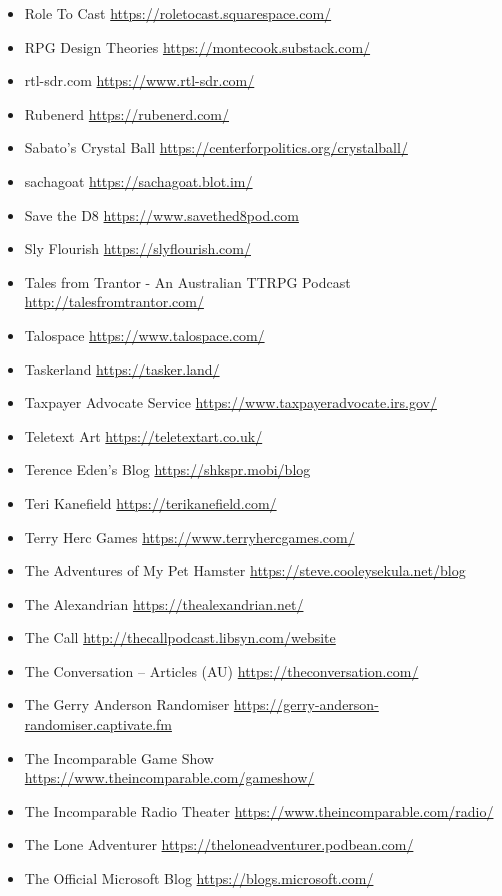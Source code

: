 \begin{itemize}
\item
  Role To Cast \url{https://roletocast.squarespace.com/}
\item
  RPG Design Theories \url{https://montecook.substack.com/}
\item
  rtl-sdr.com \url{https://www.rtl-sdr.com/}
\item
  Rubenerd \url{https://rubenerd.com/}
\item
  Sabato's Crystal Ball \url{https://centerforpolitics.org/crystalball/}
\item
  sachagoat \url{https://sachagoat.blot.im/}
\item
  Save the D8 \url{https://www.savethed8pod.com}
\item
  Sly Flourish \url{https://slyflourish.com/}
\item
  Tales from Trantor - An Australian TTRPG Podcast
  \url{http://talesfromtrantor.com/}
\item
  Talospace \url{https://www.talospace.com/}
\item
  Taskerland \url{https://tasker.land/}
\item
  Taxpayer Advocate Service \url{https://www.taxpayeradvocate.irs.gov/}
\item
  Teletext Art \url{https://teletextart.co.uk/}
\item
  Terence Eden's Blog \url{https://shkspr.mobi/blog}
\item
  Teri Kanefield \url{https://terikanefield.com/}
\item
  Terry Herc Games \url{https://www.terryhercgames.com/}
\item
  The Adventures of My Pet Hamster
  \url{https://steve.cooleysekula.net/blog}
\item
  The Alexandrian \url{https://thealexandrian.net/}
\item
  The Call \url{http://thecallpodcast.libsyn.com/website}
\item
  The Conversation -- Articles (AU) \url{https://theconversation.com/}
\item
  The Gerry Anderson Randomiser
  \url{https://gerry-anderson-randomiser.captivate.fm}
\item
  The Incomparable Game Show
  \url{https://www.theincomparable.com/gameshow/}
\item
  The Incomparable Radio Theater
  \url{https://www.theincomparable.com/radio/}
\item
  The Lone Adventurer \url{https://theloneadventurer.podbean.com/}
\item
  The Official Microsoft Blog \url{https://blogs.microsoft.com/}

\end{itemize}
